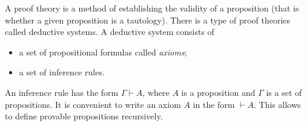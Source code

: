 

\setcounter{section}{2}
\setcounter{subsection}{1}
\setcounter{dfn}{0}

A proof theory is a method of establishing the validity of a proposition (that is whether a given proposition is a tautology).
There is a type of proof theories called deductive systems.
A deductive system consists of
\begin{itemize}
\item a set of propositional formulas called \emph{axioms};
\item a set of inference rules.
\end{itemize}

An inference rule has the form $\Gamma \vdash A$, where $A$ is a proposition and $\Gamma$ is a set of propositions.
It is convenient to write an axiom $A$ in the form $\vdash A$.
This allows to define provable propositions recursively.



